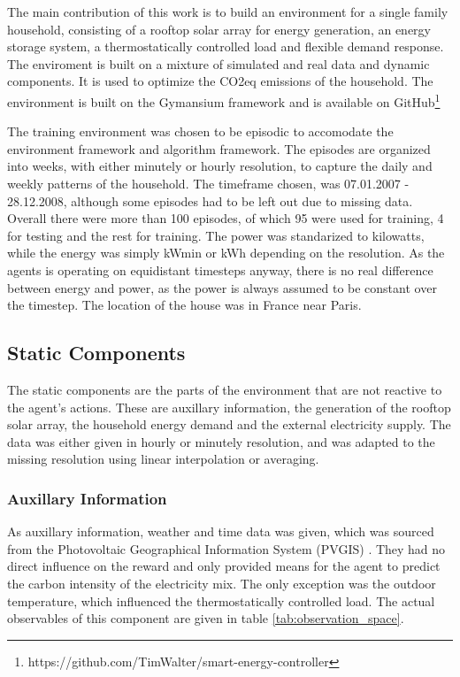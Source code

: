 The main contribution of this work is to build an environment for a single family household, consisting of a rooftop solar array for energy generation, an energy storage system, a thermostatically controlled load and flexible demand response. The enviroment is built on a mixture of simulated and real data and dynamic components. It is used to optimize the CO2eq emissions of the household. The environment is built on the Gymansium framework \cite{Towers.2023} and is available on GitHub\footnote{https://github.com/TimWalter/smart-energy-controller}
\par
The training environment was chosen to be episodic to accomodate the environment framework\cite{Towers.2023} and algorithm framework\cite{AntoninRaffin.2021}. The episodes are organized into weeks, with either minutely or hourly resolution, to capture the daily and weekly patterns of the household. The timeframe chosen, was 07.01.2007 - 28.12.2008, although some episodes had to be left out due to missing data. Overall there were more than 100 episodes, of which 95 were used for training, 4 for testing and the rest for training. The power was standarized to kilowatts, while the energy was simply kWmin or kWh depending on the resolution. As the agents is operating on equidistant timesteps anyway, there is no real difference between energy and power, as the power is always assumed to be constant over the timestep. The location of the house was in France near Paris.


\subsection{Static Components}\label{ssec:static_components}
The static components are the parts of the environment that are not reactive to the agent's actions. These are auxillary information, the generation of the rooftop solar array, the household energy demand and the external electricity supply. The data was either given in hourly or minutely resolution, and was adapted to the missing resolution using linear interpolation or averaging.

\subsubsection{Auxillary Information}\label{sssec:auxillary_information}
As auxillary information, weather and time data was given, which was sourced from the Photovoltaic Geographical Information System (PVGIS) \cite{ThomasHuld.2012}. They had no direct influence on the reward and only provided means for the agent to predict the carbon intensity of the electricity mix. The only exception was the outdoor temperature, which influenced the thermostatically controlled load. The actual observables of this component are given in table \ref{tab:observation_space}.

